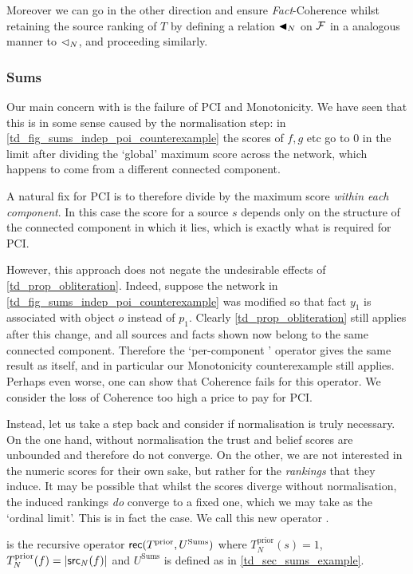 Moreover we can go in the other direction and ensure \emph{Fact}-Coherence
whilst retaining the source ranking of $T$ by defining a relation $\mathrel{\blacktriangleleft}_N$ on
$\mathcal{F}$ in a analogous manner to $\mathrel{\lhd}_N$, and proceeding similarly.

\subsubsection{Sums}

Our main concern with \sums{} is the failure of PCI and Monotonicity.  We have
seen that this is in some sense caused by the normalisation step: in
\cref{td_fig_sums_indep_poi_counterexample} the scores of $f, g$ etc go to 0 in
the limit after dividing the `global' maximum score across the network, which
happens to come from a different connected component.

A natural fix for PCI is to therefore divide by the maximum score
\emph{within each component}. In this case the score for a source $s$ depends
only on the structure of the connected component in which it lies, which is
exactly what is required for PCI.

However, this approach does not negate the undesirable effects of
\cref{td_prop_obliteration}. Indeed, suppose the network in
\cref{td_fig_sums_indep_poi_counterexample} was modified so that fact $y_1$ is
associated with object $o$ instead of $p_1$. Clearly \cref{td_prop_obliteration}
still applies after this change, and all sources and facts shown now belong to
the same connected component. Therefore the `per-component \sums{}' operator
gives the same result as \sums{} itself, and in particular our Monotonicity
counterexample still applies. Perhaps even worse, one can show that Coherence
fails for this operator. We consider the loss of Coherence too high a price to
pay for PCI.

Instead, let us take a step back and consider if normalisation is truly
necessary. On the one hand, without normalisation the trust and belief scores
are unbounded and therefore do not converge. On the other, we are not
interested in the numeric scores for their own sake, but rather for the
\emph{rankings} that they induce. It may be possible that whilst the scores
diverge without normalisation, the induced rankings \emph{do} converge to a
fixed one, which we may take as the `ordinal limit'. This is in fact the case.
We call this new operator \usums{}.

\begin{definition}

\usums{} is the recursive operator $\mathsf{rec}(T^{\text{prior}}, U^{\text{Sums}})$
where $T_N^{\text{prior}}(s) = 1$, $T_N^{\text{prior}}(f) = |\mathsf{src}_N(f)|$ and
$U^{\text{Sums}}$ is defined as in \cref{td_sec_sums_example}.\footnotemark{}

\end{definition}

